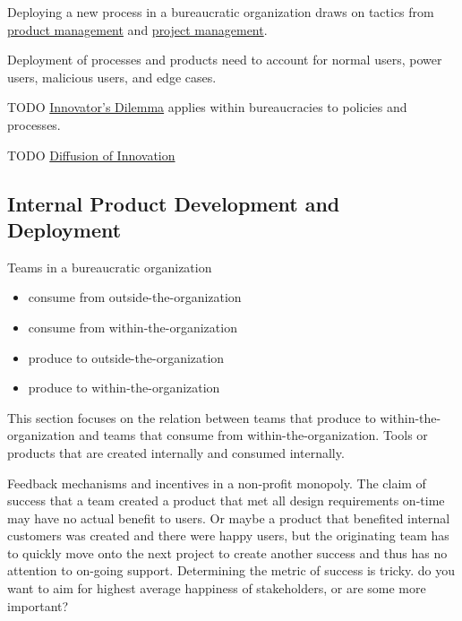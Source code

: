 Deploying a new process in a bureaucratic organization draws on tactics from 
\href{https://en.wikipedia.org/wiki/Product_management}{product management} and
\href{https://en.wikipedia.org/wiki/Project_management}{project management}. 

Deployment of processes and products need to account for 
normal users, power users, malicious users, and edge cases.

TODO
\href{https://en.m.wikipedia.org/wiki/The_Innovator's_Dilemma}{Innovator's Dilemma} applies within bureaucracies to policies and processes.

TODO
\href{https://en.wikipedia.org/wiki/Diffusion_of_innovations}{Diffusion of Innovation}



\subsection*{Internal Product Development and Deployment\label{sec:internal-product}}

Teams in a bureaucratic organization 
\begin{itemize}
    \item consume from outside-the-organization
    \item consume from within-the-organization
    \item produce to outside-the-organization
    \item produce to within-the-organization
\end{itemize}

This section focuses on the relation between teams that produce to within-the-organization and teams that consume from within-the-organization. Tools or products that are created internally and consumed internally.

Feedback mechanisms and incentives in a non-profit monopoly. The claim of success that a team created a product that met all design requirements on-time may have no actual benefit to users. Or maybe a product that benefited internal customers was created and there were happy users, but the originating team has to quickly move onto the next project to create another success and thus has no attention to on-going support. Determining the metric of success is tricky. do you want to aim for highest average happiness of stakeholders, or are some more important?

